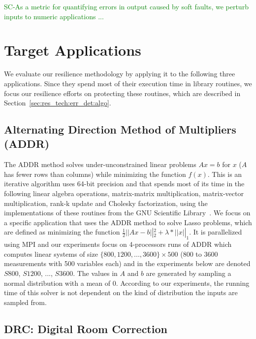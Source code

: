 \documentclass{sig-alternate}
\newcommand{\sui}[1]{%
  \textcolor{green}{SC-#1}
}
\newcommand{\greg}[1]{%
  \textcolor{blue}{GB: #1}
}
\begin{document}
\sui{As a metric for quantifying errors in output caused by soft faults, we perturb inputs to numeric applications ...}

\section{Target Applications}
\label{sec:apps}

We evaluate our resilience methodology by applying it to the following three applications.
Since they spend most of their execution time in library routines, we focus our resilience efforts on protecting these routines, which are described in Section~\ref{sec:res_tech:err_det:algo}.


\subsection{Alternating Direction Method of Multipliers (ADDR)}
\label{sec:apps:lasso}
The ADDR method solves under-unconstrained linear problems $Ax=b$ for $x$ ($A$ has fewer rows than columns) while minimizing the function $f(x)$.
This is an iterative algorithm uses 64-bit precision and that spends most of its time in the following linear algebra operations, matrix-matrix multiplication, matrix-vector multiplication, rank-k update and Cholesky factorization, using the implementations of these routines from the GNU Scientific Library~\cite{gsl:2011}.
We focus on a specific application that uses the ADDR method to solve Lasso problems, which are defined as minimizing the function $\frac{1}{2} \left|| Ax - b \right||_2^2 + \lambda*\left|| x \right||_1$.
It is parallelized using MPI and our experiments focus on 4-processors runs of ADDR which computes linear systems of size $\{800, 1200, ..., 3600\} \times 500$ (800 to 3600 measurements with 500 variables each) and in the experiments below are denoted $S800$, $S1200$, ..., $S3600$.
The values in $A$ and $b$ are generated by sampling a normal distribution with a mean of 0.
According to our experiments, the running time of this solver is not dependent on the kind of distribution the inputs are sampled from.

\subsection{DRC: Digital Room Correction}
\label{sec:apps:drc}
\end{document}

